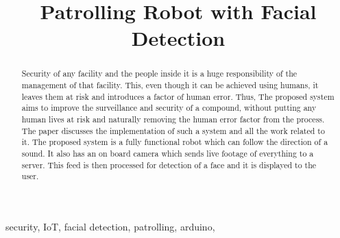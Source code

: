 \documentclass[journal]{IEEEtran}
\begin{document}

\title{Patrolling Robot with Facial Detection}

\author{
}

\maketitle

\begin{abstract}
	Security of any facility and the people inside it is a 	huge responsibility of the management of that facility. This, even though it can be achieved using humans, it leaves them at risk and introduces a factor of human
	error. Thus, The proposed system aims to improve the
	surveillance and security of a compound, without
	putting any human lives at risk and naturally removing
	the human error factor from the process. The paper
	discusses the implementation of such a system and all the
	work related to it. The proposed system is a fully
	functional robot which can follow the direction of a sound.
	It also has an on board camera which sends live footage
	of everything to a server. This feed is then processed
	for detection of a face and it is displayed to the user.
\end{abstract}

\begin{IEEEkeywords}
	security, IoT, facial detection, patrolling, arduino,
\end{IEEEkeywords}
\end{document}
